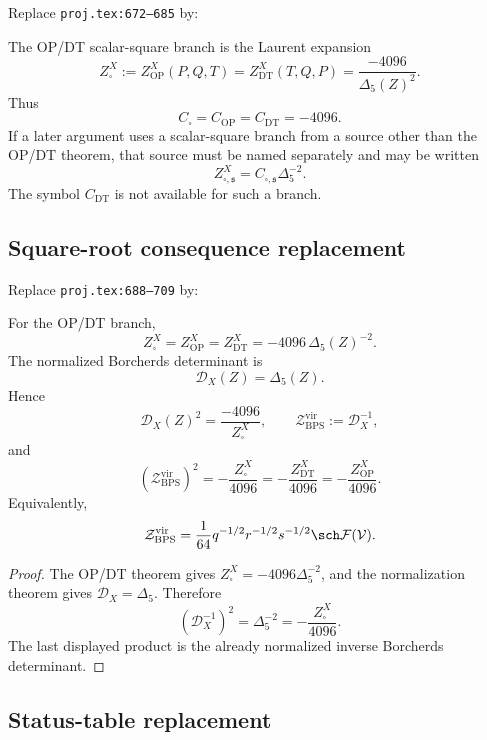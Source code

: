 Replace \texttt{proj.tex:672--685} by:

\begin{definition}
The OP/DT scalar-square branch is the Laurent expansion
\[
Z^X_{\square}
:=Z^X_{\mathrm{OP}}(P,Q,T)
=Z^X_{\mathrm{DT}}(T,Q,P)
=\frac{-4096}{\Delta_5(Z)^2}.
\]
Thus
\[
C_{\square}=C_{\mathrm{OP}}=C_{\mathrm{DT}}=-4096.
\]
If a later argument uses a scalar-square branch from a source other than
the OP/DT theorem, that source must be named separately and may be
written
\[
Z^X_{\square,\mathfrak s}=C_{\square,\mathfrak s}\Delta_5^{-2}.
\]
The symbol \(C_{\mathrm{DT}}\) is not available for such a branch.
\end{definition}

\subsection{Square-root consequence replacement}

Replace \texttt{proj.tex:688--709} by:

\begin{theorem}
For the OP/DT branch,
\[
Z^X_{\square}
=Z^X_{\mathrm{OP}}
=Z^X_{\mathrm{DT}}
=-4096\,\Delta_5(Z)^{-2}.
\]
The normalized Borcherds determinant is
\[
\mathcal D_X(Z)=\Delta_5(Z).
\]
Hence
\[
\mathcal D_X(Z)^2
=\frac{-4096}{Z^X_{\square}},
\qquad
\mathcal Z_{\mathrm{BPS}}^{\mathrm{vir}}:=\mathcal D_X^{-1},
\]
and
\begin{equation}
\label{eq:cell14-square-root}
\left(\mathcal Z_{\mathrm{BPS}}^{\mathrm{vir}}\right)^2
=-\frac{Z^X_{\square}}{4096}
=-\frac{Z^X_{\mathrm{DT}}}{4096}
=-\frac{Z^X_{\mathrm{OP}}}{4096}.
\end{equation}
Equivalently,
\[
\mathcal Z_{\mathrm{BPS}}^{\mathrm{vir}}
=\frac{1}{64}q^{-1/2}r^{-1/2}s^{-1/2}
\sch\mathcal F(\mathcal V).
\]
\end{theorem}

\begin{proof}
The OP/DT theorem gives \(Z^X_{\square}=-4096\Delta_5^{-2}\), and the
normalization theorem gives \(\mathcal D_X=\Delta_5\).  Therefore
\[
(\mathcal D_X^{-1})^2=\Delta_5^{-2}
=-\frac{Z^X_{\square}}{4096}.
\]
The last displayed product is the already normalized inverse
Borcherds determinant.
\end{proof}

\subsection{Status-table replacement}

